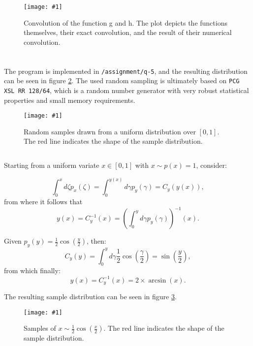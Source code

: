 \documentclass[10pt, a4paper]{article}
\newcommand{\plot}[3]{\begin{figure}[ht]\centering\texttt{[image: \#1]}\caption{#2}\label{#3}\end{figure}}
\begin{document}
  \plot{assignment-q-4}{
    Convolution of the function g and h. The plot depicts the functions themselves, their exact
    convolution, and the result of their numerical convolution.
  }{fig:conv}

\section{}
  \subsection{}
  The program is implemented in \texttt{/assignment/q-5}, and the resulting distribution can be seen in
  figure \ref{fig:uniform}. The used random sampling is ultimately based on \texttt{PCG XSL RR 128/64},
  which is a random number generator with very robust statistical properties and small memory
  requirements\cite{pcg}.

  \plot{assignment-q-5-a}{
    Random samples drawn from a uniform distribution over $[0,1]$. The red line indicates the shape of
    the sample distribution.
  }{fig:uniform}

  \subsection{}
  \label{sec:sample}
  Starting from a uniform variate $x \in [0,1]$ with $x \sim p(x) = 1$, consider:

  \begin{equation}
    \int_0^x d\zeta p_x(\zeta) = \int_0^{y(x)} d\gamma p_y(\gamma) = C_y(y(x)),
  \end{equation}
  from where it follows that
  \begin{equation}
    y(x) = C_y^{-1}(x) = \left(\int_0^y d\gamma p_y(\gamma)\right)^{-1}(x).
  \end{equation}

  Given $p_y(y) = \frac{1}{2} \cos(\frac{y}{2})$, then:
  \begin{equation}
    C_y(y) = \int_0^y d\gamma \frac{1}{2} \cos(\frac{\gamma}{2}) = \sin(\frac{y}{2}),
  \end{equation}
  from which finally:
  \begin{equation}
    y(x) = C_y^{-1}(x) = 2 \times \arcsin(x).
  \end{equation}

  The resulting sample distribution can be seen in figure \ref{fig:sample}.

  \plot{assignment-q-5-b}{
    Samples of $x \sim \frac{1}{2} \cos(\frac{x}{2})$. The red line indicates the shape of
    the sample distribution.
  }{fig:sample}
\end{document}

